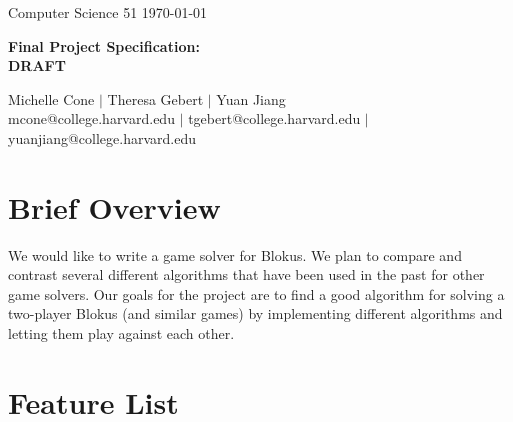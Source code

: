 \documentclass[11pt]{article}
\begin{document}
\doublespacing

\noindent Computer Science 51 \hfill \today\\
\noindent\makebox[\linewidth]{\rule{6.5in}{2.0pt}}

\begin{center}

{{\LARGE \bf Final Project Specification:}} \\
\vspace{3mm}
{{\LARGE \bf DRAFT}}

\noindent\makebox[\linewidth]{\rule{6.5in}{2.0pt}}

\vspace{3mm}

{\large Michelle Cone $|$ Theresa Gebert $|$ Yuan Jiang \\
\normalsize mcone@college.harvard.edu $|$ tgebert@college.harvard.edu $|$ yuanjiang@college.harvard.edu} \\

\end{center}


\vspace{2mm}


\section{Brief Overview}

We would like to write a game solver for Blokus. We plan to compare and contrast several different algorithms that have been used in the past for other game solvers. Our goals for the project are to find a good algorithm for solving a two-player Blokus (and similar games) by implementing different algorithms and letting them play against each other.

\vspace{2mm}

\section{Feature List}
\end{document}

